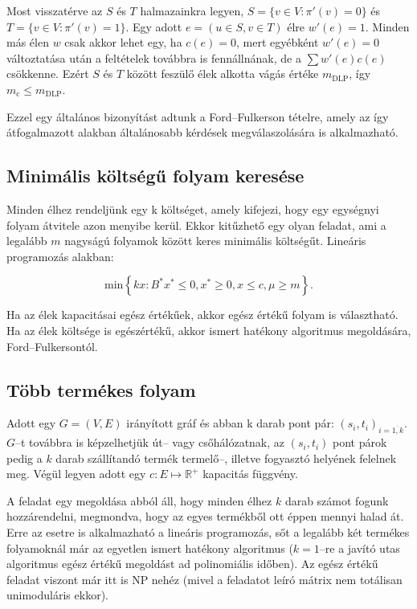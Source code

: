 Most visszatérve az $S$ és $T$ halmazainkra legyen, $S=\{v \in V: \pi'(v)=0\} $
és $T=\{v \in V: \pi'(v)=1\}$. Egy adott $e=(u \in S, v \in T)$ élre $w'(e)=1$.
Minden más élen $w$ csak akkor lehet egy, ha $c(e)=0$, mert egyébként $w'(e)=0$
változtatása után a feltételek továbbra is fennállnának, de a $\sum w'(e)c(e)$
csökkenne. Ezért $S$ és $T$ között feszülő élek alkotta vágás értéke
$m_{\mbox{DLP}}$, így $m_{\mbox{c}} \leq m_{\mbox{DLP}}$.

Ezzel egy általános bizonyítást adtunk a Ford--Fulkerson tételre, amely az így
átfogalmazott alakban általánosabb kérdések megválaszolására is alkalmazható.

\subsection{Minimális költségű folyam keresése}

Minden élhez rendeljünk egy k költséget, amely kifejezi, hogy egy egységnyi folyam
átvitele azon menyibe kerül. Ekkor kitűzhető egy olyan feladat, ami a legalább
$m$ nagyságú folyamok között keres minimális költségűt. Lineáris programozás alakban:

\[ \mbox{min} \left\{kx: B^*x^* \leq 0, x^* \geq 0, x \leq c,\mu \geq m \right\}. \]

Ha az élek kapacitásai egész értékűek, akkor egész értékű folyam is választható.
Ha az élek költsége is egészértékű, akkor ismert hatékony algoritmus megoldására,
Ford--Fulkersontól.

\subsection{Több termékes folyam}

Adott egy $G=(V,E)$ irányított gráf és abban k darab pont pár:
$(s_i,t_i)_{i = \overline{1,k}}$. $G$--t továbbra is képzelhetjük út-- vagy
csőhálózatnak, az $(s_i, t_i)$ pont párok pedig a $k$ darab szállítandó termék
termelő--, illetve fogyasztó helyének felelnek meg. Végül legyen adott egy $c:E
\mapsto \mathbb{R}^+$ kapacitás függvény.

A feladat egy megoldása abból áll, hogy minden élhez $k$ darab számot fogunk
hozzárendelni, megmondva, hogy az egyes termékből ott éppen mennyi halad át.
Erre az esetre is alkalmazható a lineáris programozás, sőt a legalább két
termékes folyamoknál már az egyetlen ismert hatékony algoritmus ($k=1$--re a
javító utas algoritmus egész értékű megoldást ad polinomiális időben). Az egész
értékű feladat viszont már itt is NP nehéz (mivel a feladatot leíró mátrix nem
totálisan unimoduláris ekkor).